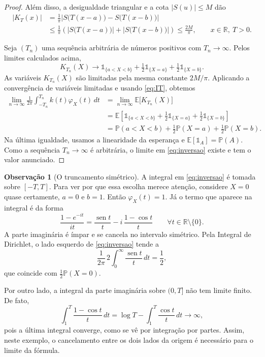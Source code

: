 \documentclass[12pt,portuguese]{article}
\theoremstyle{definition}
\newtheorem{remark}[remark]{Observação}
\theoremstyle{plainexercise}
\theoremstyle{starredexercise}
\theoremstyle{definition}
\renewcommand{\sin}{\operatorname{sen}}
\begin{document}
\begin{proof}
Além disso, a desigualdade triangular e a cota $|S(u)|\leqslant M$ dão
\begin{align*}
|K_T(x)|
&=\frac{1}{\pi}\left|S\bigl(T(x-a)\bigr)-S\bigl(T(x-b)\bigr)\right|
\\[0.3cm]
&\leqslant\frac{1}{\pi}\left(
\left|S\bigl(T(x-a)\bigr)\right|
+\left|S\bigl(T(x-b)\bigr)\right|\right)
\leqslant\frac{2M}{\pi},
\qquad x\in\mathbb{R},\ T>0.
\end{align*}

Seja $(T_n)$ uma sequência arbitrária de números positivos com $T_n\to\infty$.
Pelos limites calculados acima,
\[
K_{T_n}(X)\longrightarrow
\mathds{1}_{\{a<X<b\}}
+\tfrac12\mathds{1}_{\{X=a\}}
+\tfrac12\mathds{1}_{\{X=b\}}.
\]
As variáveis $K_{T_n}(X)$ são limitadas pela mesma constante $2M/\pi$.
Aplicando a convergência de variáveis limitadas e usando \eqref{eq:IT},
obtemos
\begin{align*}
\lim_{n\to\infty}\frac{1}{2\pi}
\int_{-T_n}^{T_n}k(t)\varphi_X(t)\,dt
&=\lim_{n\to\infty}\mathbb{E}\bigl[K_{T_n}(X)\bigr]
\\[0.3cm]
&=\mathbb{E}\left[
\mathds{1}_{\{a<X<b\}}
+\tfrac12\mathds{1}_{\{X=a\}}
+\tfrac12\mathds{1}_{\{X=b\}}
\right]
\\[0.3cm]
&=\mathbb{P}(a<X<b)
+\tfrac12\mathbb{P}(X=a)
+\tfrac12\mathbb{P}(X=b).
\end{align*}
Na última igualdade, usamos a linearidade da esperança e
$\mathbb{E}[\mathds{1}_A]=\mathbb{P}(A)$. Como a sequência $T_n\to\infty$
é arbitrária, o limite em \eqref{eq:inversao} existe e tem o valor anunciado.
\end{proof}

\begin{remark}[O truncamento simétrico]\label{rem:inversao-limite}
A integral em \eqref{eq:inversao} é tomada sobre $[-T,T]$. Para ver por que
essa escolha merece atenção, considere $X=0$ quase certamente, $a=0$ e $b=1$.
Então $\varphi_X(t)=1$. Já o termo que aparece na integral é da forma
\[
\frac{1-e^{-it}}{it}
=\frac{\sin t}{t}-i\,\frac{1-\cos t}{t}
\qquad \forall t\in \mathbb{R}\setminus \{0\}.
\]
A parte imaginária é ímpar e se cancela no intervalo simétrico. Pela Integral
de Dirichlet, o lado esquerdo de \eqref{eq:inversao} tende a
\[
\frac{1}{2\pi}\,2\int_0^\infty\frac{\sin t}{t}\,dt=\frac12,
\]
que coincide com $\tfrac12\mathbb{P}(X=0)$.

Por outro lado, a integral da parte imaginária sobre $(0,T]$ não tem limite
finito. De fato,
\[
\int_1^T\frac{1-\cos t}{t}\,dt
=\log T-\int_1^T\frac{\cos t}{t}\,dt\longrightarrow\infty,
\]
pois a última integral converge, como se vê por integração por partes.
Assim, neste exemplo, o cancelamento entre os dois lados da origem é
necessário para o limite da fórmula.
\end{remark}
\end{document}
